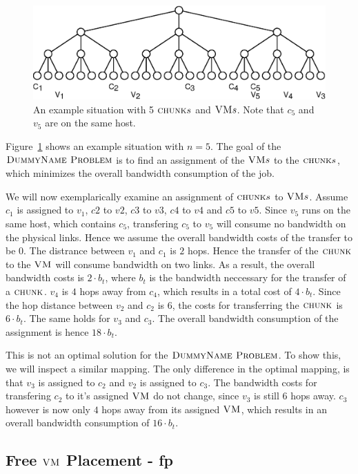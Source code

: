 \begin{figure}[htbp]
\includegraphics[width = \columnwidth]{figs/basic_scenario_3.eps}
\caption{An example situation with 5 $\textsc{chunk} s$ and $\textsc{VM} s$. Note that $c_5$ and $v_5$ are on the same host.}
\label{fig:model_clean}
\end{figure}



Figure~\ref{fig:model_clean} shows an example situation with $n = 5$. The goal of the $\textsc{DummyName Problem}$  is to find an assignment of the $\textsc{VM} s$ to the $\textsc{chunk} s$, which minimizes the overall bandwidth consumption of the job. 

We will now exemplarically examine an assignment of $\textsc{chunk} s$ to $\textsc{VM} s$. Assume $c_1$ is assigned to $v_1$, $c2$ to $v2$, $c3$ to $v3$, $c4$ to $v4$ and $c5$ to $v5$. Since $v_5$ runs on the same host, which contains $c_5$, transfering $c_5$ to $v_5$ will consume no bandwidth on the physical links. Hence we assume the overall bandwidth costs of the transfer to be $0$. The distrance between $v_1$ and $c_1$ is $2$ hops. Hence the transfer of the $\textsc{chunk}$ to the $\textsc{VM}$ will consume bandwidth on two links. As a result, the overall bandwidth costs is $2 \cdot b_t$, where $b_t$ is the bandwidth neccessary for the transfer of a $\textsc{chunk}$. $v_4$ is $4$ hops away from $c_4$, which results in a total cost of $4 \cdot b_t$. Since the hop distance between $v_2$ and $c_2$ is 6, the costs for transferring the $\textsc{chunk}$ is $6 \cdot b_t$. The same holds for $v_3$ and $c_3$. The overall bandwidth consumption of the assignment is hence $18 \cdot b_t$. 

This is not an optimal solution for the $\textsc{DummyName Problem}$. To show this, we will inspect a similar mapping. The only difference in the optimal mapping, is that $v_3$ is assigned to $c_2$ and $v_2$ is assigned to $c_3$. The bandwidth costs for transfering $c_2$ to it's assigned $\textsc{VM}$ do not change, since $v_3$ is still $6$ hops away. $c_3$ however is now only $4$ hops away from its assigned $\textsc{VM}$, which results in an overall bandwidth consumption of $16 \cdot b_t$.

\subsection{Free $\textsc{VM}$ Placement - fp}

